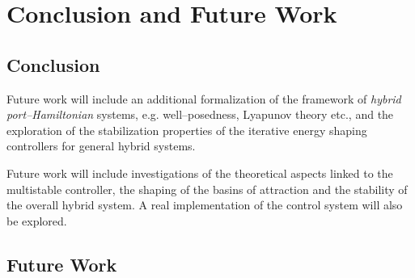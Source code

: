 \chapter{Conclusion and Future Work}
\label{chap:conclusion_future_work}
\minitoc

\thispagestyle{empty}

\newpage
\section{Conclusion}
Future work will include an additional formalization of the framework of \textit{hybrid port--Hamiltonian} systems, e.g. well--posedness, Lyapunov theory etc., and the exploration of the stabilization properties of the {iterative energy shaping} controllers for general hybrid systems.

Future work will include investigations of the theoretical aspects linked to the multistable controller, the shaping of the basins of attraction and the stability of the overall hybrid system. A real implementation of the control system will also be explored.

\section{Future Work}
%

